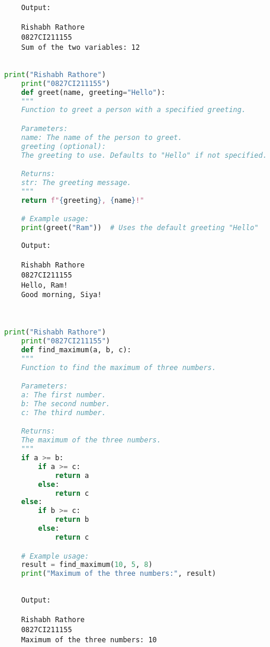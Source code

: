 \documentclass{report}
\begin{document}
\begin{verbatim}
	Output:

	Rishabh Rathore
	0827CI211155
	Sum of the two variables: 12


\end{verbatim}


\newpage


\sol 
\begin{lstlisting}[language=Python]
	print("Rishabh Rathore")
	print("0827CI211155")
	def greet(name, greeting="Hello"):
    """
    Function to greet a person with a specified greeting.

    Parameters:
    name: The name of the person to greet.
    greeting (optional): 
	The greeting to use. Defaults to "Hello" if not specified.

    Returns:
    str: The greeting message.
    """
    return f"{greeting}, {name}!"

	# Example usage:
	print(greet("Ram"))  # Uses the default greeting "Hello"

\end{lstlisting}

\begin{verbatim}
	Output:

	Rishabh Rathore
	0827CI211155
	Hello, Ram!
	Good morning, Siya!
	
	
\end{verbatim}


\newpage


\sol 
\begin{lstlisting}[language=Python]
	print("Rishabh Rathore")
	print("0827CI211155")
	def find_maximum(a, b, c):
    """
    Function to find the maximum of three numbers.

    Parameters:
    a: The first number.
    b: The second number.
    c: The third number.

    Returns:
    The maximum of the three numbers.
    """
    if a >= b:
        if a >= c:
            return a
        else:
            return c
    else:
        if b >= c:
            return b
        else:
            return c

	# Example usage:
	result = find_maximum(10, 5, 8)
	print("Maximum of the three numbers:", result)
  

\end{lstlisting}

\begin{verbatim}
	Output:

	Rishabh Rathore
	0827CI211155
	Maximum of the three numbers: 10

\end{verbatim}
\end{document}
